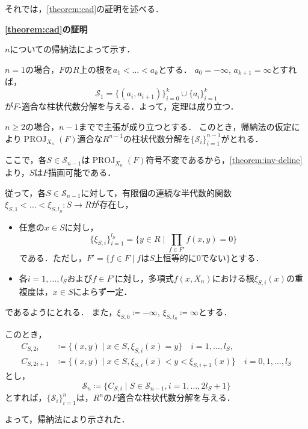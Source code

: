\documentclass[uplatex, dvipdfmx]{jsarticle}
\makeatletter
\numberwithin{equation}{section}
\renewenvironment{proof}[1][\proofname]{\par
  \pushQED{\qed}%
  \normalfont \topsep6\p@\@plus6\p@\relax
  \trivlist
  \item\relax
  {\bfseries
  #1\@addpunct{.}}\hspace\labelsep\ignorespaces
}{
  \popQED\endtrivlist\@endpefalse
}
\newcommand{\map}[3]{{#1}\colon{#2}\rightarrow{#3}}
\DeclareMathOperator{\PROJ}{PROJ}
\theoremstyle{definition}
\renewcommand{\proofname}{\textbf{証明}}
\makeatother
\begin{document}
それでは，\cref{theorem:cad}の証明を述べる．

\begin{proof}[\cref{theorem:cad}の証明]
     $n$についての帰納法によって示す．

     $n=1$の場合，$F$の$R$上の根を$a_1 < \dots < a_k$とする．
     $a_0 = -\infty$, $a_{k+1} = \infty$とすれば，
     \begin{equation}
          \mathcal{S}_1 = \{(a_i, a_{i+1})\}_{i=0}^k \cup \{a_i\}_{i=1}^k
     \end{equation}
     が$F$-適合な柱状代数分解を与える．よって，定理は成り立つ．

     $n\geq 2$の場合，$n-1$までで主張が成り立つとする．
     このとき，帰納法の仮定により$\PROJ_{X_n}(F)$適合な$R^{n-1}$の柱状代数分解を$\{\mathcal{S}_i\}_{i=1}^{n-1}$がとれる．

     ここで，各$S \in \mathcal{S}_{n-1}$は$\PROJ_{X_n}(F)$符号不変であるから，\cref{theorem:inv-deline}より，$S$は$F$描画可能である．

     従って，各$S \in \mathcal{S}_{n-1}$に対して，有限個の連続な半代数的関数$\map{\xi_{S,1}< \dots < \xi_{S,l_S}}{S}{R}$が存在し，
     \begin{itemize}
          \item 任意の$ x \in S $に対し，
          \begin{equation}
               \{\xi_{S,i}\}_{i=1}^{l_S} = \{y \in R \mid \prod_{f \in F'}f(x,y)=0\}
          \end{equation}
          である．ただし，$F' = \{f \in F \mid \text{$f$は$S$上恒等的に0でない}\}$とする．
          \item 各$i=1, \dots, l_S$および$f \in F'$に対し，多項式$f(x,X_n)$における根$\xi_{S,i}(x)$の重複度は，$x\in S$によらず一定．
     \end{itemize}
     であるようにとれる．
     また，$\xi_{S,0} \coloneqq -\infty$, $\xi_{S,l_S} \coloneqq \infty$とする．

     このとき，
     \begin{align}
          C_{S,2i} &\coloneqq \{(x,y) \mid  x \in S, \xi_{S,i}(x) = y \} \quad i = 1,\dots, l_S,\\
          C_{S,2i+1} &\coloneqq \{(x,y) \mid x \in S, \xi_{S,i}(x)<y<\xi_{S,i+1}(x) \} \quad i = 0,1, \dots, l_S 
     \end{align}
     とし，
     \begin{equation}
          \mathcal{S}_n \coloneqq \{C_{S,i} \mid S \in \mathcal{S}_{n-1}, i=1, \dots, 2l_S+1\}
     \end{equation}
     とすれば，$\{\mathcal{S}_i\}_{i=1}^n$は，$R^n$の$F$適合な柱状代数分解を与える．

     よって，帰納法により示された．
\end{proof}
\end{document}
